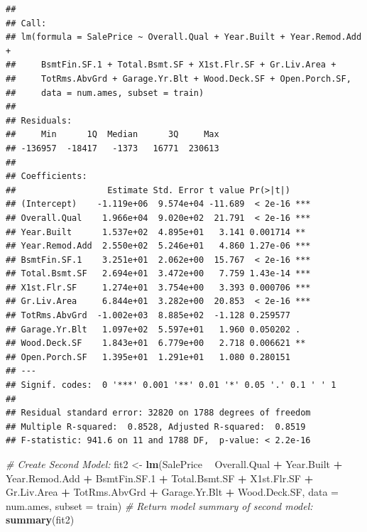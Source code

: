 \documentclass[
]{article}
\newenvironment{Shaded}{\begin{snugshade}}{\end{snugshade}}
\newcommand{\CommentTok}[1]{\textcolor[rgb]{0.56,0.35,0.01}{\textit{#1}}}
\newcommand{\DataTypeTok}[1]{\textcolor[rgb]{0.13,0.29,0.53}{#1}}
\newcommand{\FloatTok}[1]{\textcolor[rgb]{0.00,0.00,0.81}{#1}}
\newcommand{\KeywordTok}[1]{\textcolor[rgb]{0.13,0.29,0.53}{\textbf{#1}}}
\newcommand{\NormalTok}[1]{#1}
\newcommand{\OperatorTok}[1]{\textcolor[rgb]{0.81,0.36,0.00}{\textbf{#1}}}
\newcommand{\StringTok}[1]{\textcolor[rgb]{0.31,0.60,0.02}{#1}}
\begin{document}
\begin{verbatim}
## 
## Call:
## lm(formula = SalePrice ~ Overall.Qual + Year.Built + Year.Remod.Add + 
##     BsmtFin.SF.1 + Total.Bsmt.SF + X1st.Flr.SF + Gr.Liv.Area + 
##     TotRms.AbvGrd + Garage.Yr.Blt + Wood.Deck.SF + Open.Porch.SF, 
##     data = num.ames, subset = train)
## 
## Residuals:
##     Min      1Q  Median      3Q     Max 
## -136957  -18417   -1373   16771  230613 
## 
## Coefficients:
##                  Estimate Std. Error t value Pr(>|t|)    
## (Intercept)    -1.119e+06  9.574e+04 -11.689  < 2e-16 ***
## Overall.Qual    1.966e+04  9.020e+02  21.791  < 2e-16 ***
## Year.Built      1.537e+02  4.895e+01   3.141 0.001714 ** 
## Year.Remod.Add  2.550e+02  5.246e+01   4.860 1.27e-06 ***
## BsmtFin.SF.1    3.251e+01  2.062e+00  15.767  < 2e-16 ***
## Total.Bsmt.SF   2.694e+01  3.472e+00   7.759 1.43e-14 ***
## X1st.Flr.SF     1.274e+01  3.754e+00   3.393 0.000706 ***
## Gr.Liv.Area     6.844e+01  3.282e+00  20.853  < 2e-16 ***
## TotRms.AbvGrd  -1.002e+03  8.885e+02  -1.128 0.259577    
## Garage.Yr.Blt   1.097e+02  5.597e+01   1.960 0.050202 .  
## Wood.Deck.SF    1.843e+01  6.779e+00   2.718 0.006621 ** 
## Open.Porch.SF   1.395e+01  1.291e+01   1.080 0.280151    
## ---
## Signif. codes:  0 '***' 0.001 '**' 0.01 '*' 0.05 '.' 0.1 ' ' 1
## 
## Residual standard error: 32820 on 1788 degrees of freedom
## Multiple R-squared:  0.8528, Adjusted R-squared:  0.8519 
## F-statistic: 941.6 on 11 and 1788 DF,  p-value: < 2.2e-16
\end{verbatim}

\begin{Shaded}
\begin{Highlighting}[]
\CommentTok{# Create Second Model:}
\NormalTok{fit2 <-}\StringTok{ }\KeywordTok{lm}\NormalTok{(SalePrice }\OperatorTok{~}\StringTok{ }\NormalTok{Overall.Qual }\OperatorTok{+}\StringTok{ }\NormalTok{Year.Built }\OperatorTok{+}\StringTok{ }\NormalTok{Year.Remod.Add }\OperatorTok{+}\StringTok{ }\NormalTok{BsmtFin.SF}\FloatTok{.1} \OperatorTok{+}\StringTok{ }\NormalTok{Total.Bsmt.SF }\OperatorTok{+}\StringTok{ }\NormalTok{X1st.Flr.SF }\OperatorTok{+}\StringTok{ }\NormalTok{Gr.Liv.Area }\OperatorTok{+}\StringTok{ }\NormalTok{TotRms.AbvGrd }\OperatorTok{+}
\StringTok{            }\NormalTok{Garage.Yr.Blt }\OperatorTok{+}\StringTok{ }\NormalTok{Wood.Deck.SF, }\DataTypeTok{data =}\NormalTok{ num.ames, }\DataTypeTok{subset =}\NormalTok{ train)}
\CommentTok{# Return model summary of second model:}
\KeywordTok{summary}\NormalTok{(fit2)}
\end{Highlighting}
\end{Shaded}
\end{document}
